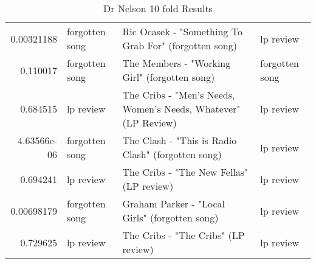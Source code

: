 \documentclass[letterpaper,10pt]{article}
\begin{document}
\begin{table}[H]
\begin{adjustbox}{max width=\linewidth}
\begin{tabular}{rlll}
  0.00321188  & forgotten song            & Ric Ocasek - "Something To Grab For"  (forgotten song)                                                       & lp review                 \\
  0.110017    & forgotten song            & The Members - "Working Girl"  (forgotten song)                                                               & forgotten song            \\
  0.684515    & lp review                 & The Cribs - "Men's Needs, Women's Needs, Whatever"  (LP Review)                                              & lp review                 \\
  4.63566e-06 & forgotten song            & The Clash - "This is Radio Clash"  (forgotten song)                                                          & lp review                 \\
  0.694241    & lp review                 & The Cribs - "The New Fellas"  (LP review)                                                                    & lp review                 \\
  0.00698179  & forgotten song            & Graham Parker - "Local Girls"   (forgotten song)                                                             & lp review                 \\
  0.729625    & lp review                 & The Cribs - "The Cribs"  (LP review)                                                                         & lp review                 \\
\hline
\end{tabular}
\end{adjustbox}
\caption{Dr Nelson 10 fold Results}
  \label{tab:dnresults10f}
\end{table}

\newpage
  

\newpage
\clearpage


\clearpage

\clearpage
   
\end{document}

